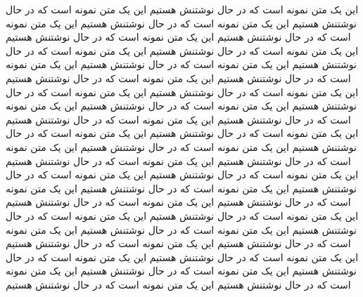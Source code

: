 \documentclass[a4paper,12pt,twoside]{book}
\begin{document}
این یک متن نمونه است که در حال نوشتنش هستیم  این یک متن نمونه است که در حال نوشتنش هستیم این یک متن نمونه است که در حال نوشتنش هستیم این یک متن نمونه است که در حال نوشتنش هستیم این یک متن نمونه است که در حال نوشتنش هستیم این یک متن نمونه است که در حال نوشتنش هستیم این یک متن نمونه است که در حال نوشتنش هستیم
این یک متن نمونه است که در حال نوشتنش هستیم  این یک متن نمونه است که در حال نوشتنش هستیم این یک متن نمونه است که در حال نوشتنش هستیم این یک متن نمونه است که در حال نوشتنش هستیم این یک متن نمونه است که در حال نوشتنش هستیم این یک متن نمونه است که در حال نوشتنش هستیم این یک متن نمونه است که در حال نوشتنش هستیم
این یک متن نمونه است که در حال نوشتنش هستیم  این یک متن نمونه است که در حال نوشتنش هستیم این یک متن نمونه است که در حال نوشتنش هستیم این یک متن نمونه است که در حال نوشتنش هستیم این یک متن نمونه است که در حال نوشتنش هستیم این یک متن نمونه است که در حال نوشتنش هستیم این یک متن نمونه است که در حال نوشتنش هستیم
این یک متن نمونه است که در حال نوشتنش هستیم  این یک متن نمونه است که در حال نوشتنش هستیم این یک متن نمونه است که در حال نوشتنش هستیم این یک متن نمونه است که در حال نوشتنش هستیم این یک متن نمونه است که در حال نوشتنش هستیم این یک متن نمونه است که در حال نوشتنش هستیم این یک متن نمونه است که در حال نوشتنش هستیم
این یک متن نمونه است که در حال نوشتنش هستیم  این یک متن نمونه است که در حال نوشتنش هستیم این یک متن نمونه است که در حال نوشتنش هستیم این یک متن نمونه است که در حال نوشتنش هستیم این یک متن نمونه است که در حال نوشتنش هستیم این یک متن نمونه است که در حال نوشتنش هستیم این یک متن نمونه است که در حال نوشتنش هستیم

\newpage
\end{document}
